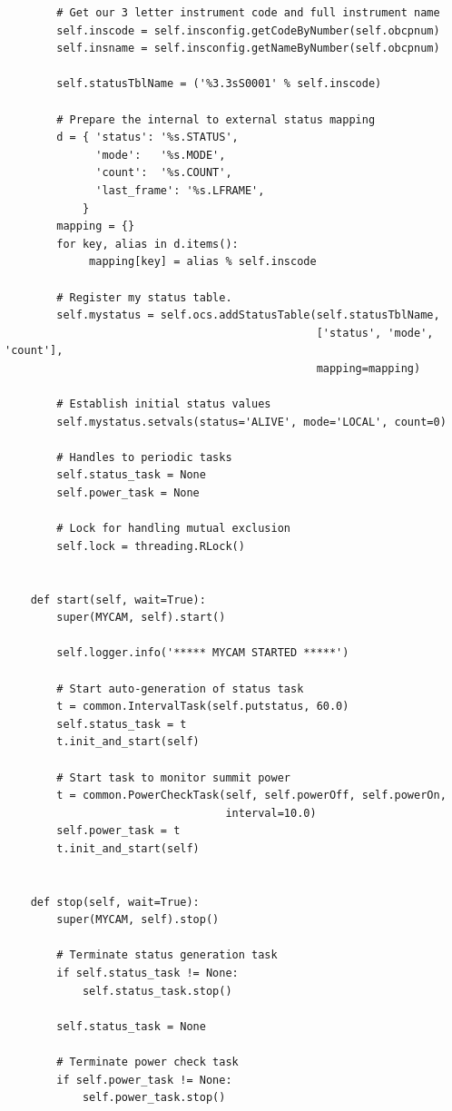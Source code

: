 \documentclass[11pt]{report}
\begin{document}
\begin{verbatim}
        # Get our 3 letter instrument code and full instrument name
        self.inscode = self.insconfig.getCodeByNumber(self.obcpnum)
        self.insname = self.insconfig.getNameByNumber(self.obcpnum)
        
        self.statusTblName = ('%3.3sS0001' % self.inscode)

        # Prepare the internal to external status mapping
        d = { 'status': '%s.STATUS',
              'mode':   '%s.MODE',
              'count':  '%s.COUNT',
              'last_frame': '%s.LFRAME',
            }
        mapping = {}
        for key, alias in d.items():
             mapping[key] = alias % self.inscode

        # Register my status table.
        self.mystatus = self.ocs.addStatusTable(self.statusTblName,
                                                ['status', 'mode', 'count'],
                                                mapping=mapping)
        
        # Establish initial status values
        self.mystatus.setvals(status='ALIVE', mode='LOCAL', count=0)

        # Handles to periodic tasks
        self.status_task = None
        self.power_task = None

        # Lock for handling mutual exclusion
        self.lock = threading.RLock()


    def start(self, wait=True):
        super(MYCAM, self).start()
        
        self.logger.info('***** MYCAM STARTED *****')

        # Start auto-generation of status task
        t = common.IntervalTask(self.putstatus, 60.0)
        self.status_task = t
        t.init_and_start(self)

        # Start task to monitor summit power
        t = common.PowerCheckTask(self, self.powerOff, self.powerOn,
                                  interval=10.0)
        self.power_task = t
        t.init_and_start(self)


    def stop(self, wait=True):
        super(MYCAM, self).stop()
        
        # Terminate status generation task
        if self.status_task != None:
            self.status_task.stop()

        self.status_task = None

        # Terminate power check task
        if self.power_task != None:
            self.power_task.stop()


\end{verbatim}
\end{document}
